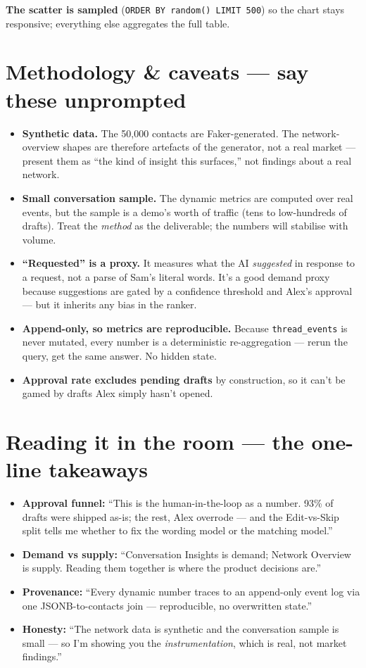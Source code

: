 \documentclass[11pt, a4paper]{article}
\begin{document}
\textbf{The scatter is sampled} (\texttt{ORDER BY random() LIMIT 500}) so the chart stays responsive; everything else aggregates the full table.

\section{Methodology \& caveats --- say these unprompted}
\label{sec:caveats}
\begin{itemize}
  \item \textbf{Synthetic data.} The 50{,}000 contacts are Faker-generated. The network-overview shapes are therefore artefacts of the generator, not a real market --- present them as ``the kind of insight this surfaces,'' not findings about a real network.
  \item \textbf{Small conversation sample.} The dynamic metrics are computed over real events, but the sample is a demo's worth of traffic (tens to low-hundreds of drafts). Treat the \emph{method} as the deliverable; the numbers will stabilise with volume.
  \item \textbf{``Requested'' is a proxy.} It measures what the AI \emph{suggested} in response to a request, not a parse of Sam's literal words. It's a good demand proxy because suggestions are gated by a confidence threshold and Alex's approval --- but it inherits any bias in the ranker.
  \item \textbf{Append-only, so metrics are reproducible.} Because \texttt{thread\_events} is never mutated, every number is a deterministic re-aggregation --- rerun the query, get the same answer. No hidden state.
  \item \textbf{Approval rate excludes pending drafts} by construction, so it can't be gamed by drafts Alex simply hasn't opened.
\end{itemize}

\section{Reading it in the room --- the one-line takeaways}
\begin{itemize}
  \item \textbf{Approval funnel:} ``This is the human-in-the-loop as a number. 93\% of drafts were shipped as-is; the rest, Alex overrode --- and the Edit-vs-Skip split tells me whether to fix the wording model or the matching model.''
  \item \textbf{Demand vs supply:} ``Conversation Insights is demand; Network Overview is supply. Reading them together is where the product decisions are.''
  \item \textbf{Provenance:} ``Every dynamic number traces to an append-only event log via one JSONB-to-contacts join --- reproducible, no overwritten state.''
  \item \textbf{Honesty:} ``The network data is synthetic and the conversation sample is small --- so I'm showing you the \emph{instrumentation}, which is real, not market findings.''
\end{itemize}
\end{document}
